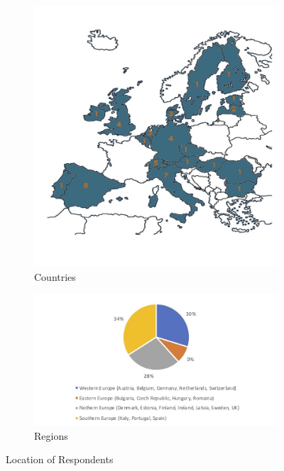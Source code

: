 \documentclass[11pt]{amsart}
\begin{document}
\begin{figure}[h]
\centering
\begin{subfigure}{.5\textwidth}
  \centering
  \includegraphics[width=\linewidth]{charts/map.jpg}
  \caption{Countries}
  \label{fig:map}
\end{subfigure}%
\begin{subfigure}{.5\textwidth}
  \centering
  \includegraphics[width=1.5\linewidth]{charts/regions.jpg}
   \caption{Regions}
  \label{fig:members}
\end{subfigure}
\caption{Location of Respondents}
\label{fig:mapandmembers}
\end{figure}
\end{document}
